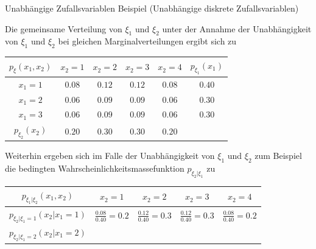 \documentclass[
  8pt,
  ignorenonframetext,
]{beamer}
\begin{document}
\begin{frame}{Unabhängige Zufallsvariablen}
\protect\hypertarget{unabhuxe4ngige-zufallsvariablen-3}{}
Beispiel (Unabhängige diskrete Zufallsvariablen) \vspace{1mm}
\footnotesize

Die gemeinsame Verteilung von \(\xi_1\) und \(\xi_2\) unter der Annahme
der Unabhängigkeit von \(\xi_1\) und \(\xi_2\) bei gleichen
Marginalverteilungen ergibt sich zu \vspace{2mm}

\begin{center}
\begin{tabular}{|c|cccc|c|}
\hline
$p_\xi(x_1,x_2)$    &   $x_2 = 1$   &   $x_2 = 2$   &   $x_2 = 3$   &   $x_2 = 4$   & $p_{\xi_1}(x_1)$  \\\hline
$x_1 = 1$       &   $0.08$      &   $0.12$      &   $0.12$      &   $0.08$      & $0.40$            \\
$x_1 = 2$       &   $0.06$      &   $0.09$      &   $0.09$      &   $0.06$      & $0.30$            \\
$x_1 = 3$       &   $0.06$      &   $0.09$      &   $0.09$      &   $0.06$      & $0.30$            \\\hline
$p_{\xi_2}(x_2)$    &   $0.20$      &   $0.30$      &   $0.30$      &   $0.20$       &                  \\\hline
\end{tabular}
\end{center}
\vspace{2mm}

Weiterhin ergeben sich im Falle der Unabhängigkeit von \(\xi_1\) und
\(\xi_2\) zum Beispiel die bedingten Wahrscheinlichkeitsmassefunktion
\(p_{\xi_2|\xi_1}\) zu \vspace{2mm}

\renewcommand{\arraystretch}{1.3}
\begin{center}
\begin{tabular}{|c|cccc|}
\hline
$p_{\xi_1|\xi_2}(x_1,x_2)$
&   $x_2 = 1$
&   $x_2 = 2$
&   $x_2 = 3$
&   $x_2 = 4$
\\\hline
$p_{\xi_2|\xi_1 = 1}(x_2|x_1 = 1)$

&   $\frac{0.08}{0.40} = 0.2$

&   $\frac{0.12}{0.40} = 0.3$

&   $\frac{0.12}{0.40} = 0.3$

&   $\frac{0.08}{0.40} = 0.2$
\\
$p_{\xi_2|\xi_1 = 2}(x_2|x_1 = 2)$


\end{tabular}
\end{center}
\end{frame}
\end{document}
